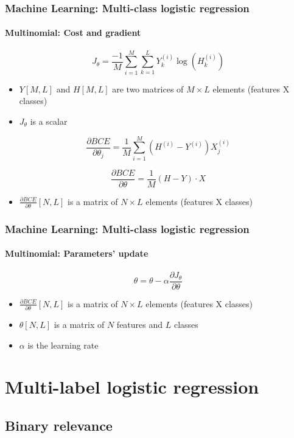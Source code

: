 \documentclass[xcolor=table]{beamer}
\begin{document}
\begin{frame}
	\frametitle{Machine Learning: Multi-class logistic regression}
	\framesubtitle{Multinomial: Cost and gradient}
	
	\[J_\theta = \frac{-1}{M} \sum\limits_{i=1}^{M} \sum_{k=1}^{L} Y^{(i)}_k \log(H^{(i)}_k)\]
	\begin{itemize}
		\item $Y[M, L]$ and $H[M, L]$ are two matrices of $M\times L$ elements (features X classes)
		\item $J_\theta$ is a scalar
	\end{itemize}
	
	
	\[
	\frac{\partial BCE}{\partial \theta_j} = \frac{1}{M} \sum\limits_{i=1}^{M} (H^{(i)} - Y^{(i)}) X_j^{(i)}
	\]
	
	\[
	\frac{\partial BCE}{\partial \theta} = \frac{1}{M} (H - Y) \cdot X
	\]
	
	\begin{itemize}
		\item $\frac{\partial BCE}{\partial \theta}[N, L]$ is a matrix of $N\times L$ elements (features X classes)
	\end{itemize}
	
\end{frame}

\begin{frame}
	\frametitle{Machine Learning: Multi-class logistic regression}
	\framesubtitle{Multinomial: Parameters' update}
	
	\[\theta = \theta - \alpha \frac{\partial J_\theta}{\partial \theta}\]
	
	\begin{itemize}
		\item $\frac{\partial BCE}{\partial \theta}[N, L]$ is a matrix of $N\times L$ elements (features X classes)
		\item $\theta[N, L]$ is a matrix of $N$ features and $L$ classes
		\item $\alpha$ is the learning rate
	\end{itemize}
	
\end{frame}

\section{Multi-label logistic regression}

\subsection{Binary relevance}
\end{document}
